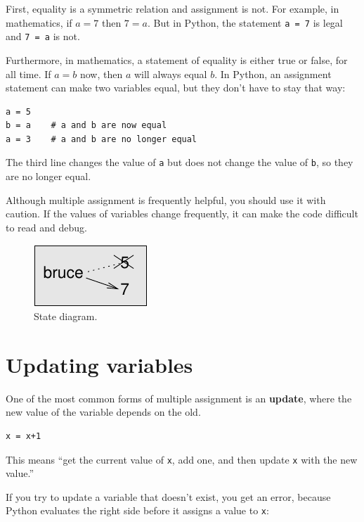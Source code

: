 \documentclass[10pt]{book}
\begin{document}
\begin{CJK}{UTF8}{gbsn}
First, equality is a symmetric relation and assignment is not.  For
example, in mathematics, if $a=7$ then $7=a$.  But in Python, the
statement {\tt a = 7} is legal and {\tt 7 = a} is not.

Furthermore, in mathematics, a statement of equality is either true or
false, for all time.  If $a=b$ now, then $a$ will always equal $b$.
In Python, an assignment statement can make two variables equal, but
they don't have to stay that way:

\begin{verbatim}
a = 5
b = a    # a and b are now equal
a = 3    # a and b are no longer equal
\end{verbatim}
%
The third line changes the value of {\tt a} but does not change the
value of {\tt b}, so they are no longer equal. 

Although multiple assignment is frequently helpful, you should use it
with caution.  If the values of variables change frequently, it can
make the code difficult to read and debug.

\begin{figure}
\centerline
{\includegraphics[scale=0.8]{figs/assign2.pdf}}
\caption{State diagram.}
\label{fig.assign2}
\end{figure}



\section{Updating variables}
\label{update}


One of the most common forms of multiple assignment is an {\bf update},
where the new value of the variable depends on the old.

\begin{verbatim}
x = x+1
\end{verbatim}
%
This means ``get the current value of {\tt x}, add one, and then
update {\tt x} with the new value.''

If you try to update a variable that doesn't exist, you get an
error, because Python evaluates the right side before it assigns
a value to {\tt x}:


\end{CJK}
\end{document}
